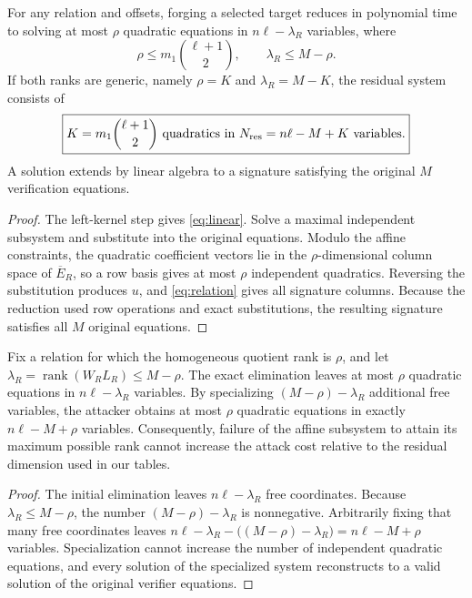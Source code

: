 \documentclass[runningheads]{llncs}
\newcommand{\rank}{\operatorname{rank}}
\begin{document}
\begin{theorem}\label{thm:residual}
For any relation and offsets, forging a selected target reduces in polynomial time to solving at most $\rho$ quadratic equations in $n\ell-\lambda_R$ variables, where
\[
 \rho\le m_1\binom{\ell+1}{2},
 \qquad
 \lambda_R\le M-\rho.
\]
If both ranks are generic, namely $\rho=K$ and $\lambda_R=M-K$, the residual system consists of
\begin{equation}\label{eq:resparams}
 \boxed{
 K=m_1\binom{\ell+1}{2}\text{ quadratics in }
 N_{\rm res}=n\ell-M+K\text{ variables}.}
\end{equation}
A solution extends by linear algebra to a signature satisfying the original $M$ verification equations.
\end{theorem}

\begin{proof}
The left-kernel step gives \cref{eq:linear}.  Solve a maximal independent subsystem and substitute into the original equations.  Modulo the affine constraints, the quadratic coefficient vectors lie in the $\rho$-dimensional column space of $\overline E_R$, so a row basis gives at most $\rho$ independent quadratics.  Reversing the substitution produces $u$, and \cref{eq:relation} gives all signature columns.  Because the reduction used row operations and exact substitutions, the resulting signature satisfies all $M$ original equations.
\end{proof}

\begin{proposition}
\label{prop:affine-rank-monotonicity}
Fix a relation for which the homogeneous quotient rank is $\rho$, and let
$\lambda_R=\rank(W_RL_R)\le M-\rho$.  The exact elimination leaves at most
$\rho$ quadratic equations in $n\ell-\lambda_R$ variables.  By specializing
$(M-\rho)-\lambda_R$ additional free variables, the attacker obtains at most
$\rho$ quadratic equations in exactly $n\ell-M+\rho$ variables.  Consequently,
failure of the affine subsystem to attain its maximum possible rank cannot
increase the attack cost relative to the residual dimension used in our tables.
\end{proposition}

\begin{proof}
The initial elimination leaves $n\ell-\lambda_R$ free coordinates.  Because
$\lambda_R\le M-\rho$, the number $(M-\rho)-\lambda_R$ is nonnegative.
Arbitrarily fixing that many free coordinates leaves
$n\ell-\lambda_R-\bigl((M-\rho)-\lambda_R\bigr)=n\ell-M+\rho$ variables.
Specialization cannot increase the number of independent quadratic equations,
and every solution of the specialized system reconstructs to a valid solution
of the original verifier equations.
\end{proof}
\end{document}
